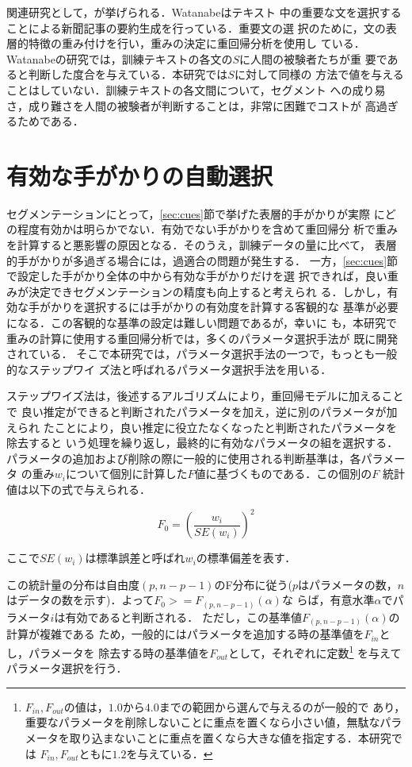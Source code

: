 関連研究として，\cite{Watanabe:96}が挙げられる．Watanabeはテキスト
中の重要な文を選択することによる新聞記事の要約生成を行っている．重要文の選
択のために，文の表層的特徴の重み付けを行い，重みの決定に重回帰分析を使用し
ている．Watanabeの研究では，訓練テキストの各文の$S$に人間の被験者たちが重
要であると判断した度合を与えている．本研究では$S$に対して同様の
方法で値を与えることはしていない．訓練テキストの各文間について，セグメント
への成り易さ，成り難さを人間の被験者が判断することは，非常に困難でコストが
高過ぎるためである．

\section{有効な手がかりの自動選択}\label{sec:select}
セグメンテーションにとって，\ref{sec:cues}節で挙げた表層的手がかりが実際
にどの程度有効かは明らかでない．有効でない手がかりを含めて重回帰分
析で重みを計算すると悪影響の原因となる．そのうえ，訓練データの量に比べて，
表層的手がかりが多過ぎる場合には，過適合の問題が発生する．
一方，\ref{sec:cues}節で設定した手がかり全体の中から有効な手がかりだけを選
択できれば，良い重みが決定できセグメンテーションの精度も向上すると考えられ
る．しかし，有効な手がかりを選択するには手がかりの有効度を計算する客観的な
基準が必要になる．この客観的な基準の設定は難しい問題であるが，幸いに
も，本研究で重みの計算に使用する重回帰分析では，多くのパラメータ選択手法が
既に開発されている．
そこで本研究では，パラメータ選択手法の一つで，もっとも一般的なステップワイ
ズ法\cite{Jobson:91}と呼ばれるパラメータ選択手法を用いる．

ステップワイズ法は，後述するアルゴリズムにより，重回帰モデルに加えることで
良い推定ができると判断されたパラメータを加え，逆に別のパラメータが加えられ
たことにより，良い推定に役立たなくなったと判断されたパラメータを除去すると
いう処理を繰り返し，最終的に有効なパラメータの組を選択する．
パラメータの追加および削除の際に一般的に使用される判断基準は，各パラメータ
の重み$w_{i}$について個別に計算した$F$値に基づくものである．この個別の$F$
統計値は以下の式で与えられる．

\begin{equation}\label{equ:fvalue}
\displaystyle{F_0 = ( \frac{w_i}{SE(w_i)} )^2}
\end{equation}

ここで$SE(w_i)$は標準誤差と呼ばれ$w_i$の標準偏差を表す．

この統計量の分布は自由度$(p,n-p-1)$のF分布に従う($p$はパラメータの数，$n$
はデータの数を示す)．よって$\displaystyle{F_0>= F_{(p,n-p-1)}(\alpha)}$な
らば，有意水準$\alpha$でパラメータ$i$は有効であると判断される．
ただし，この基準値$\displaystyle{F_{(p,n-p-1)}(\alpha)}$の計算が複雑である
ため，一般的にはパラメータを追加する時の基準値を$F_{in}$とし，パラメータを
除去する時の基準値を$F_{out}$として，それぞれに定数\footnote{$F_{in},
F_{out}$の値は，$1.0$から$4.0$までの範囲から選んで与えるのが一般的で
あり，重要なパラメータを削除しないことに重点を置くなら小さい値，無駄なパラ
メータを取り込まないことに重点を置くなら大きな値を指定する．本研究では
$F_{in},F_{out}$ともに$1.2$を与えている．}
を与えてパラメータ選択を行う．

